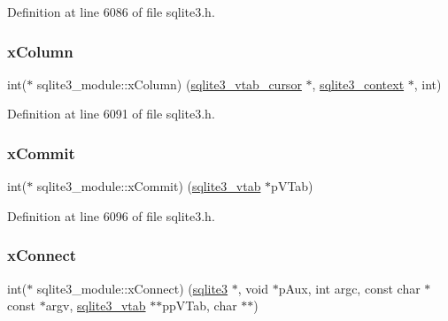 Definition at line 6086 of file sqlite3.\+h.

\mbox{\label{structsqlite3__module_a7cde490d5d06e19b90d768b90991f4a6}} 
\subsubsection{\texorpdfstring{x\+Column}{xColumn}}
{\footnotesize\ttfamily int($\ast$ sqlite3\+\_\+module\+::x\+Column) (\mbox{\hyperlink{structsqlite3__vtab__cursor}{sqlite3\+\_\+vtab\+\_\+cursor}} $\ast$, \mbox{\hyperlink{sqlite3_8h_a3b519553ffec8fc42b2356f5b1ebdc57}{sqlite3\+\_\+context}} $\ast$, int)}



Definition at line 6091 of file sqlite3.\+h.

\mbox{\label{structsqlite3__module_a1d9fa3ed3dd16165cfcda3a532a7a3fc}} 
\subsubsection{\texorpdfstring{x\+Commit}{xCommit}}
{\footnotesize\ttfamily int($\ast$ sqlite3\+\_\+module\+::x\+Commit) (\mbox{\hyperlink{structsqlite3__vtab}{sqlite3\+\_\+vtab}} $\ast$p\+V\+Tab)}



Definition at line 6096 of file sqlite3.\+h.

\mbox{\label{structsqlite3__module_a457fe622b5334195640e3e835c9923a8}} 
\subsubsection{\texorpdfstring{x\+Connect}{xConnect}}
{\footnotesize\ttfamily int($\ast$ sqlite3\+\_\+module\+::x\+Connect) (\mbox{\hyperlink{sqlite3_8h_a0ef6f2646262c8a9b24368d8ac140f69}{sqlite3}} $\ast$, void $\ast$p\+Aux, int argc, const char $\ast$const  $\ast$argv, \mbox{\hyperlink{structsqlite3__vtab}{sqlite3\+\_\+vtab}} $\ast$$\ast$pp\+V\+Tab, char $\ast$$\ast$)}



